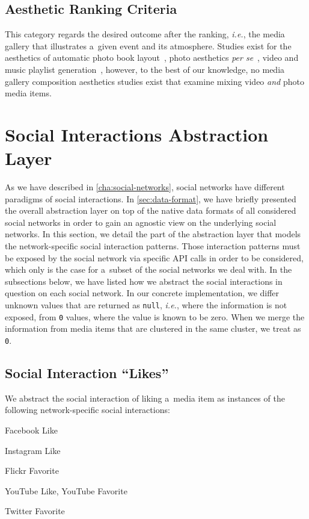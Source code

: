 \subsection{Aesthetic Ranking Criteria}
This category regards the desired outcome after the ranking, \emph{i.e.},
the media gallery that illustrates a~given event and its atmosphere.
Studies exist for the aesthetics of
automatic photo book layout~\cite{sandhaus2011photobook},
photo aesthetics \emph{per se}~\cite{obrador2012photoaesthetics},
video and music playlist generation~\cite{knees2006musicplaylist,davidson2010videorecommendation},
however, to the best of our knowledge,
no media gallery composition aesthetics studies exist
that examine mixing video \emph{and} photo media items.

\section{Social Interactions Abstraction Layer}

As we have described in \autoref{cha:social-networks},
social networks have different paradigms of social interactions.
In \autoref{sec:data-format}, we have briefly presented the overall
abstraction layer on top of the native data formats
of all considered social networks in order to gain
an agnostic view on the underlying social networks.
In this section, we detail the part of the abstraction layer
that models the network-specific social interaction patterns.
Those interaction patterns must be exposed by the social network 
via specific API calls in order to be considered,
which only is the case for a~subset of the social networks we deal with.
In the subsections below, we have listed
how we abstract the social interactions in question on each social network.
In our concrete implementation, we differ unknown values
that are returned as \texttt{null}, \emph{i.e.},
where the information is not exposed,
from \texttt{0} values, where the value is known to be zero.
When we merge the information from media items
that are clustered in the same cluster, we treat  as \texttt{0}.

\subsection{Social Interaction ``Likes''}

We abstract the social interaction of liking a~media item
as instances of the following network-specific social interactions:

\begin{small_itemize}
  \item[] Facebook Like
  \item[] \googleplus \plusone
  \item[] Instagram Like
  \item[] Flickr Favorite
  \item[] YouTube Like, YouTube Favorite
  \item[] Twitter Favorite
\end{small_itemize}  

